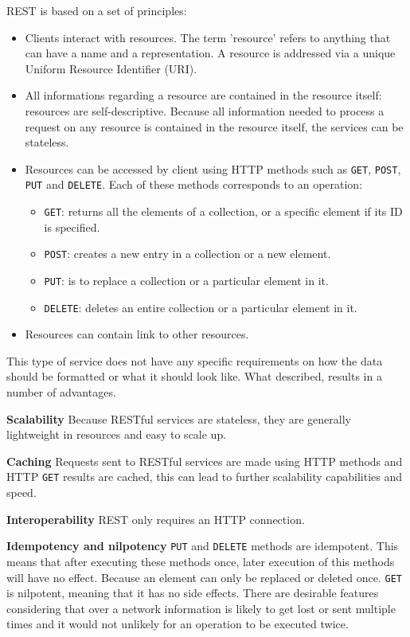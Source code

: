 REST is based on a set of principles:
\begin{itemize}
\item Clients interact with resources. The term 'resource' refers to anything that can have a name and a representation.
      A resource is addressed via a unique Uniform Resource Identifier (URI).
\item All informations regarding a resource are contained in the resource itself: resources are self-descriptive.
      Because all information needed to process a request on any resource is contained in the resource itself,
      the services can be stateless.
\item Resources can be accessed by client using HTTP methods such as \verb|GET|, \verb|POST|, \verb|PUT| and \verb|DELETE|.
      Each of these methods corresponds to an operation:
			\begin{itemize}
				\item \verb|GET|: returns all the elements of a collection, or a specific element if its ID is specified.
				\item \verb|POST|: creates a new entry in a collection or a new element.
				\item \verb|PUT|: is to replace a collection or a particular element in it.
				\item \verb|DELETE|: deletes an entire collection or a particular element in it.
			\end{itemize}
\item Resources can contain link to other resources.
\end{itemize}

This type of service does not have any specific requirements on how the data should be formatted or what it should look like.
What described, results in a number of advantages.

\textbf{Scalability}\newline
Because RESTful services are stateless, they are generally lightweight in resources and easy to scale up.

\textbf{Caching}\newline
Requests sent to RESTful services are made using HTTP methods and HTTP \verb|GET| results are cached, this can
lead to further scalability capabilities and speed.

\textbf{Interoperability}\newline
REST only requires an HTTP connection.

\textbf{Idempotency and nilpotency}\newline
\verb|PUT| and \verb|DELETE| methods are idempotent. 
This means that after executing these methods once, later execution of this methods will have no effect.
Because an element can only be replaced or deleted once.
\verb|GET| is nilpotent, meaning that it has no side effects. There are desirable features considering
that over a network information is likely to get lost or sent multiple times and it would not unlikely for an operation
to be executed twice. %

